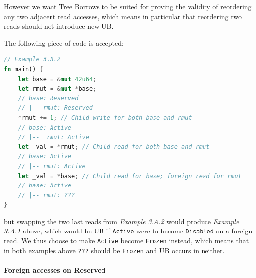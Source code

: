 \documentclass[a4paper,11pt]{article}
\theoremstyle{plain}
\theoremstyle{definition}
\theoremstyle{remark}
\newcommand{\tperm}[1]{\texttt{#1}}
\begin{document}
However we want Tree Borrows to be suited for proving the validity of reordering
any two adjacent read accesses, which means in particular that reordering two
reads should not introduce new UB.

The following piece of code is accepted:
\begin{lstlisting}[language=rust]
// Example 3.A.2
fn main() {
    let base = &mut 42u64;
    let rmut = &mut *base;
    // base: Reserved
    // |-- rmut: Reserved
    *rmut += 1; // Child write for both base and rmut
    // base: Active
    // |--  rmut: Active
    let _val = *rmut; // Child read for both base and rmut
    // base: Active
    // |-- rmut: Active
    let _val = *base; // Child read for base; foreign read for rmut
    // base: Active
    // |-- rmut: ???
}
\end{lstlisting}
but swapping the two last reads from \textit{Example 3.A.2} would produce \textit{Example 3.A.1} above,
which would be UB if \tperm{Active} were to become \tperm{Disabled} on a foreign read.
We thus choose to make \tperm{Active} become \tperm{Frozen} instead, which means that in
both examples above \tperm{???} should be \tperm{Frozen} and UB occurs in neither.

\paragraph*{Foreign accesses on Reserved}
\end{document}
